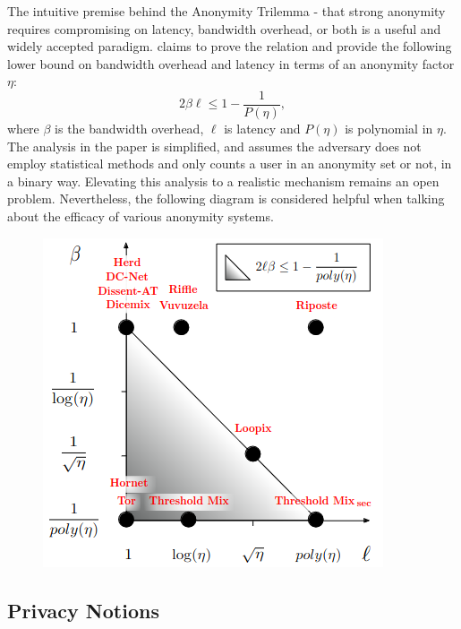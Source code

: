 \documentclass{article}
\begin{document}
The intuitive premise behind the Anonymity Trilemma - that strong anonymity requires compromising on latency, bandwidth overhead, or both is a useful and widely accepted paradigm.  claims to prove the relation and provide the following lower bound on bandwidth overhead and latency in terms of an anonymity factor $\eta$: $$2 \beta \ell\leq 1-\frac{1}{P(\eta)},$$ where $\beta$ is the bandwidth overhead, $\ell$ is latency and $P(\eta)$ is polynomial in $\eta.$ The analysis in the paper is simplified, and assumes the adversary does not employ statistical methods and only counts a user in an anonymity set or not, in a binary way. Elevating this analysis to a realistic mechanism remains an open problem. Nevertheless, the following diagram is considered helpful when talking about the efficacy of various anonymity systems.
\begin{figure}[!ht]
    \centering
    \includegraphics[scale=1.2]{triangle.png}
\end{figure}



\vfill



\pagebreak


\subsection{Privacy Notions}
\end{document}
